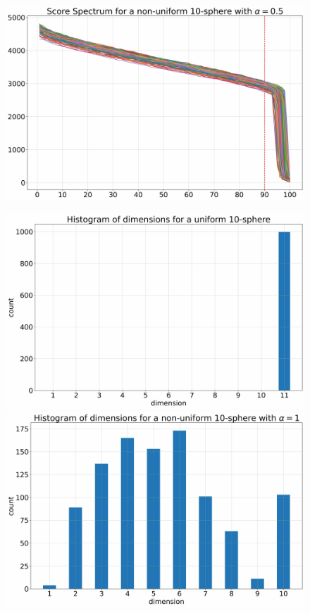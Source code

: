 \begin{figure}
\begin{minipage}[t]{0.5\textwidth}
        \includegraphics[width=0.95\linewidth]{chapter3/figures/non_uniform/spectrum_0.5.jpg}
    \end{minipage}
    \begin{minipage}[t]{0.5\textwidth}
        \includegraphics[width=0.95\linewidth]{chapter3/figures/non_uniform/dims_0.jpg}
        \includegraphics[width=0.95\linewidth]{chapter3/figures/non_uniform/dims_1.jpg}

\end{minipage}
\end{figure}
